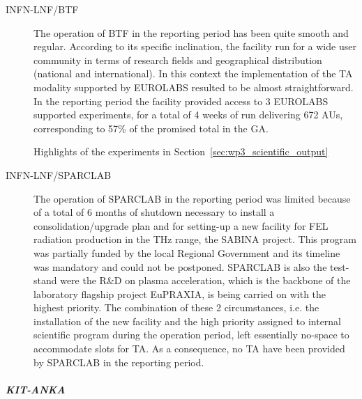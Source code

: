 \begin{description}

\item[INFN-LNF/BTF]
The operation of BTF in the reporting period has been quite smooth and regular. According to its specific inclination, the facility run for a wide user community in terms of research fields and geographical distribution (national and international). In this context the implementation of the TA modality supported by EUROLABS resulted to be almost straightforward. In the reporting period the facility provided access to 3 EUROLABS supported experiments, for a total of 4 weeks of run delivering 672 AUs, corresponding to 57\% of the promised total in the GA. 

Highlights of the experiments in Section~\ref{sec:wp3_scientific_output}

\item[INFN-LNF/SPARCLAB]

The operation of SPARCLAB in the reporting period was limited because of a total of 6 months of shutdown necessary to install a consolidation/upgrade plan and for setting-up a new facility for FEL radiation production in the THz range, the SABINA project. This program was partially funded by the local Regional Government and its timeline was mandatory and could not be postponed. SPARCLAB is also the test-stand were the R\&D on plasma acceleration, which is the backbone of the laboratory flagship project EuPRAXIA, is being carried on with the highest priority. The combination of these 2 circumstances, i.e. the installation of the new facility and the high priority assigned to internal scientific program during the operation period, left essentially no-space to accommodate slots for TA. As a consequence, no TA have been provided by SPARCLAB in the reporting period.
\end{description}


\subparagraph{KIT-ANKA} \mbox{}

